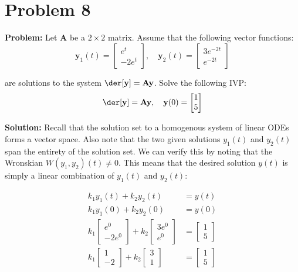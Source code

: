 \documentclass{article}
\begin{document}
\section*{Problem 8}
\noindent\textbf{Problem:} Let $\mathbf{A}$ be a $2\times2$ matrix. Assume that the following vector functions:
\begin{equation*}
    \mathbf{y}_1(t)=
    \begin{bmatrix}
        e^t\\-2e^t
    \end{bmatrix},\,\,\,\,\,\,\mathbf{y}_2(t)=
    \begin{bmatrix}
        3e^{-2t}\\e^{-2t}
    \end{bmatrix}
\end{equation*}

are solutions to the system $\der[\mathbf{y}]=\mathbf{Ay}$. Solve the following IVP:
\begin{equation*}
    \der[\mathbf{y}]=\mathbf{Ay},\,\,\,\,\,\,\mathbf{y}(0)=
    \begin{bmatrix}
        1\\5
    \end{bmatrix}
\end{equation*}
\smallskip

\noindent\textbf{Solution:} Recall that the solution set to a homogenous system of linear ODEs forms a vector space. Also note that the two given solutions $y_1(t)$ and $y_2(t)$ span the entirety of the solution set. We can verify this by noting that the Wronskian $W(y_1,y_2)(t)\not=0$. This means that the desired solution $y(t)$ is simply a linear combination of $y_1(t)$ and $y_2(t)$:

\begin{align*}
    k_1y_1(t)+k_2y_2(t)&=y(t)\\
    k_1y_1(0)+k_2y_2(0)&=y(0)\\
    k_1\begin{bmatrix}
        e^0\\-2e^0
    \end{bmatrix}+k_2\begin{bmatrix}
        3e^0\\e^0
    \end{bmatrix}&=\begin{bmatrix}
        1\\5
    \end{bmatrix}\\
    k_1\begin{bmatrix}
        1\\-2
    \end{bmatrix}+k_2\begin{bmatrix}
        3\\1
    \end{bmatrix}&=\begin{bmatrix}
        1\\5
    \end{bmatrix}
\end{align*}
\end{document}

